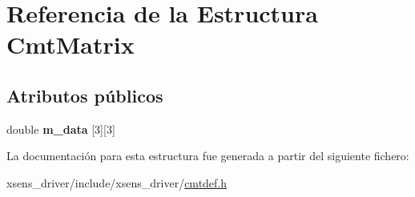 \hypertarget{structCmtMatrix}{\section{\-Referencia de la \-Estructura \-Cmt\-Matrix}
\label{structCmtMatrix}
}
\subsection*{\-Atributos públicos}
\begin{DoxyCompactItemize}
\item 
\hypertarget{structCmtMatrix_a0014634031c7bb9a4e8466da1825016f}{double {\bfseries m\-\_\-data} \mbox{[}3\mbox{]}\mbox{[}3\mbox{]}}\label{structCmtMatrix_a0014634031c7bb9a4e8466da1825016f}

\end{DoxyCompactItemize}


\-La documentación para esta estructura fue generada a partir del siguiente fichero\-:\begin{DoxyCompactItemize}
\item 
xsens\-\_\-driver/include/xsens\-\_\-driver/\hyperlink{cmtdef_8h}{cmtdef.\-h}\end{DoxyCompactItemize}
